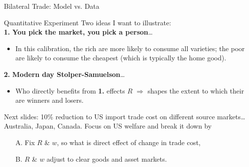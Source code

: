 \documentclass[9pt,pdftex,aspectratio=1610]{beamer}
\theoremstyle{definition}
\begin{document}
\begin{frame}[t]{Bilateral Trade: Model vs. Data}
\begin{figure}[!t]
\end{figure}
\end{frame}


\begin{frame}[t]{Quantitative Experiment}
\smallskip
Two ideas I want to illustrate:\\
\medskip
\textbf{1.} \textbf{You pick the market, you pick a person}\ldots
\begin{itemize}
  \item In this calibration, the rich are more likely to consume all varieties; the poor are likely to consume the cheapest (which is typically the home good).
\end{itemize}
\bigskip
\textbf{2.} \textbf{Modern day Stolper-Samuelson}\ldots
\begin{itemize}
\item Who directly benefits from \textbf{1.} effects $R$ $\Rightarrow$ shapes the extent to which their are winners and losers.
\end{itemize}
\bigskip
Next slides: 10\% reduction to US import trade cost on different source markets\ldots Australia, Japan, Canada. Focus on US welfare and break it down by
\begin{itemize}
\item[A.] Fix $R$ \& $w$, so what is direct effect of change in trade cost,
\smallskip
\item[B.] $R$ \& $w$ adjust to clear goods and asset markets.
\end{itemize}
\end{frame}
\end{document}
